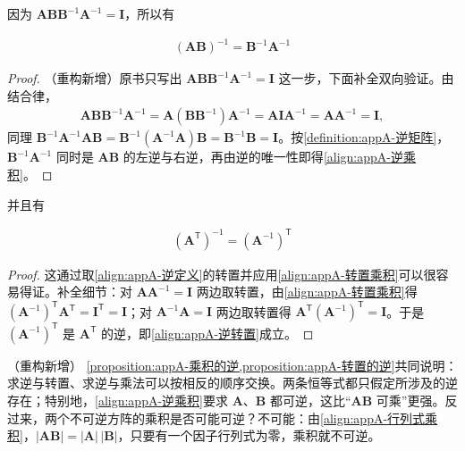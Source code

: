 \documentclass[../main.tex]{subfiles}
\begin{document}
因为 $\bm{A}\bm{B}\bm{B}^{-1}\bm{A}^{-1}=\bm{I}$，所以有
\begin{proposition}[乘积的逆]\label{proposition:appA-乘积的逆}
\begin{align}
  (\bm{A}\bm{B})^{-1}=\bm{B}^{-1}\bm{A}^{-1}
  \label{align:appA-逆乘积}
\end{align}
\end{proposition}

\begin{proof}
（重构新增）原书只写出 $\bm{A}\bm{B}\bm{B}^{-1}\bm{A}^{-1}=\bm{I}$ 这一步，下面补全双向验证。由结合律，
\begin{align*}
  \bm{A}\bm{B}\bm{B}^{-1}\bm{A}^{-1}=\bm{A}(\bm{B}\bm{B}^{-1})\bm{A}^{-1}=\bm{A}\bm{I}\bm{A}^{-1}=\bm{A}\bm{A}^{-1}=\bm{I},
\end{align*}
同理 $\bm{B}^{-1}\bm{A}^{-1}\bm{A}\bm{B}=\bm{B}^{-1}(\bm{A}^{-1}\bm{A})\bm{B}=\bm{B}^{-1}\bm{B}=\bm{I}$。按\cref{definition:appA-逆矩阵}，$\bm{B}^{-1}\bm{A}^{-1}$ 同时是 $\bm{A}\bm{B}$ 的左逆与右逆，再由逆的唯一性即得\eqref{align:appA-逆乘积}。
\end{proof}

并且有
\begin{proposition}[转置的逆]\label{proposition:appA-转置的逆}
\begin{align}
  (\bm{A}^{\mathsf{T}})^{-1}=(\bm{A}^{-1})^{\mathsf{T}}
  \label{align:appA-逆转置}
\end{align}
\end{proposition}

\begin{proof}
这通过取\eqref{align:appA-逆定义}的转置并应用\eqref{align:appA-转置乘积}可以很容易得证。补全细节：对 $\bm{A}\bm{A}^{-1}=\bm{I}$ 两边取转置，由\eqref{align:appA-转置乘积}得 $(\bm{A}^{-1})^{\mathsf{T}}\bm{A}^{\mathsf{T}}=\bm{I}^{\mathsf{T}}=\bm{I}$；对 $\bm{A}^{-1}\bm{A}=\bm{I}$ 两边取转置得 $\bm{A}^{\mathsf{T}}(\bm{A}^{-1})^{\mathsf{T}}=\bm{I}$。于是 $(\bm{A}^{-1})^{\mathsf{T}}$ 是 $\bm{A}^{\mathsf{T}}$ 的逆，即\eqref{align:appA-逆转置}成立。
\end{proof}

\begin{remark}（重构新增）
\cref{proposition:appA-乘积的逆,proposition:appA-转置的逆}共同说明：求逆与转置、求逆与乘法可以按相反的顺序交换。两条恒等式都只假定所涉及的逆存在；特别地，\eqref{align:appA-逆乘积}要求 $\bm{A}$、$\bm{B}$ 都可逆，这比“$\bm{A}\bm{B}$ 可乘”更强。反过来，两个不可逆方阵的乘积是否可能可逆？不可能：由\eqref{align:appA-行列式乘积}，$|\bm{A}\bm{B}|=|\bm{A}|\,|\bm{B}|$，只要有一个因子行列式为零，乘积就不可逆。
\end{remark}
\end{document}
